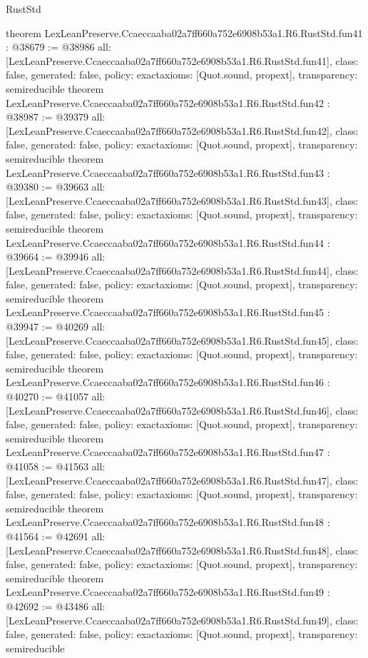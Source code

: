\begin{lexlean}{RustStd}
\begin{coremodule}
{}
theorem LexLeanPreserve.Ccaeccaaba02a7ff660a752e6908b53a1.R6.RustStd.fun41 : @38679 := @38986 {
  all: [LexLeanPreserve.Ccaeccaaba02a7ff660a752e6908b53a1.R6.RustStd.fun41],
  class: false,
  generated: false,
  policy: exact{axioms: [Quot.sound, propext]},
  transparency: semireducible
}
theorem LexLeanPreserve.Ccaeccaaba02a7ff660a752e6908b53a1.R6.RustStd.fun42 : @38987 := @39379 {
  all: [LexLeanPreserve.Ccaeccaaba02a7ff660a752e6908b53a1.R6.RustStd.fun42],
  class: false,
  generated: false,
  policy: exact{axioms: [Quot.sound, propext]},
  transparency: semireducible
}
theorem LexLeanPreserve.Ccaeccaaba02a7ff660a752e6908b53a1.R6.RustStd.fun43 : @39380 := @39663 {
  all: [LexLeanPreserve.Ccaeccaaba02a7ff660a752e6908b53a1.R6.RustStd.fun43],
  class: false,
  generated: false,
  policy: exact{axioms: [Quot.sound, propext]},
  transparency: semireducible
}
theorem LexLeanPreserve.Ccaeccaaba02a7ff660a752e6908b53a1.R6.RustStd.fun44 : @39664 := @39946 {
  all: [LexLeanPreserve.Ccaeccaaba02a7ff660a752e6908b53a1.R6.RustStd.fun44],
  class: false,
  generated: false,
  policy: exact{axioms: [Quot.sound, propext]},
  transparency: semireducible
}
theorem LexLeanPreserve.Ccaeccaaba02a7ff660a752e6908b53a1.R6.RustStd.fun45 : @39947 := @40269 {
  all: [LexLeanPreserve.Ccaeccaaba02a7ff660a752e6908b53a1.R6.RustStd.fun45],
  class: false,
  generated: false,
  policy: exact{axioms: [Quot.sound, propext]},
  transparency: semireducible
}
theorem LexLeanPreserve.Ccaeccaaba02a7ff660a752e6908b53a1.R6.RustStd.fun46 : @40270 := @41057 {
  all: [LexLeanPreserve.Ccaeccaaba02a7ff660a752e6908b53a1.R6.RustStd.fun46],
  class: false,
  generated: false,
  policy: exact{axioms: [Quot.sound, propext]},
  transparency: semireducible
}
theorem LexLeanPreserve.Ccaeccaaba02a7ff660a752e6908b53a1.R6.RustStd.fun47 : @41058 := @41563 {
  all: [LexLeanPreserve.Ccaeccaaba02a7ff660a752e6908b53a1.R6.RustStd.fun47],
  class: false,
  generated: false,
  policy: exact{axioms: [Quot.sound, propext]},
  transparency: semireducible
}
theorem LexLeanPreserve.Ccaeccaaba02a7ff660a752e6908b53a1.R6.RustStd.fun48 : @41564 := @42691 {
  all: [LexLeanPreserve.Ccaeccaaba02a7ff660a752e6908b53a1.R6.RustStd.fun48],
  class: false,
  generated: false,
  policy: exact{axioms: [Quot.sound, propext]},
  transparency: semireducible
}
theorem LexLeanPreserve.Ccaeccaaba02a7ff660a752e6908b53a1.R6.RustStd.fun49 : @42692 := @43486 {
  all: [LexLeanPreserve.Ccaeccaaba02a7ff660a752e6908b53a1.R6.RustStd.fun49],
  class: false,
  generated: false,
  policy: exact{axioms: [Quot.sound, propext]},
  transparency: semireducible
}
\end{coremodule}
\end{lexlean}

